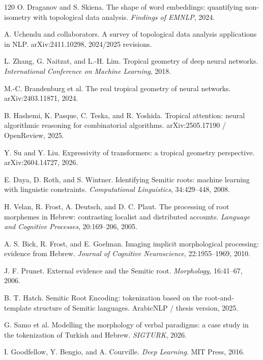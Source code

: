 \documentclass[11pt]{article}
\newcommand{\1}{\mathbf{1}}
\begin{document}
\begin{thebibliography}{120}
O. Draganov and S. Skiena. The shape of word embeddings: quantifying non-isometry with topological data analysis. \emph{Findings of EMNLP}, 2024.

A. Uchendu and collaborators. A survey of topological data analysis applications in NLP. arXiv:2411.10298, 2024/2025 revisions.

L. Zhang, G. Naitzat, and L.-H. Lim. Tropical geometry of deep neural networks. \emph{International Conference on Machine Learning}, 2018.

M.-C. Brandenburg et al. The real tropical geometry of neural networks. arXiv:2403.11871, 2024.

B. Hashemi, K. Pasque, C. Teska, and R. Yoshida. Tropical attention: neural algorithmic reasoning for combinatorial algorithms. arXiv:2505.17190 / OpenReview, 2025.

Y. Su and Y. Liu. Expressivity of transformers: a tropical geometry perspective. arXiv:2604.14727, 2026.

E. Daya, D. Roth, and S. Wintner. Identifying Semitic roots: machine learning with linguistic constraints. \emph{Computational Linguistics}, 34:429--448, 2008.

H. Velan, R. Frost, A. Deutsch, and D. C. Plaut. The processing of root morphemes in Hebrew: contrasting localist and distributed accounts. \emph{Language and Cognitive Processes}, 20:169--206, 2005.

A. S. Bick, R. Frost, and E. Goelman. Imaging implicit morphological processing: evidence from Hebrew. \emph{Journal of Cognitive Neuroscience}, 22:1955--1969, 2010.

J. F. Prunet. External evidence and the Semitic root. \emph{Morphology}, 16:41--67, 2006.

B. T. Hatch. Semitic Root Encoding: tokenization based on the root-and-template structure of Semitic languages. ArabicNLP / thesis version, 2025.

G. Samo et al. Modelling the morphology of verbal paradigms: a case study in the tokenization of Turkish and Hebrew. \emph{SIGTURK}, 2026.

I. Goodfellow, Y. Bengio, and A. Courville. \emph{Deep Learning}. MIT Press, 2016.


\end{thebibliography}
\end{document}
